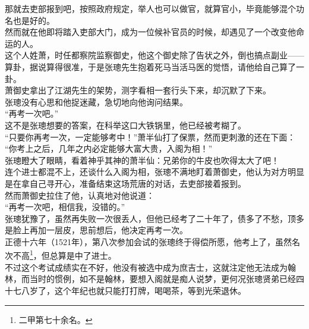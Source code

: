 \begin{multicols}{\theparacolNo}
那就去吏部报到吧，按照政府规定，举人也可以做官，就算官小，毕竟能够混个功名也是好的。\\

然而就在他即将踏入吏部大门，成为一位候补官员的时候，却遇见了一个改变他命运的人。\\

这个人姓萧，时任都察院监察御史，他这个御史除了告状之外，倒也搞点副业——算卦，据说算得很准，于是张璁先生抱着死马当活马医的觉悟，请他给自己算了一卦。\\

萧御史拿出了江湖先生的架势，测字看相一套行头下来，却沉默了下来。\\

张璁没有心思和他捉迷藏，急切地向他询问结果。\\

“再考一次吧。”\\

这不是张璁想要的答案，在科举这口大铁锅里，他已经被考糊了。\\

“只要你再考一次，一定能够考中！”萧半仙打了保票，然而更刺激的还在下面：\\

“你考上之后，几年之内必定能够大富大贵，入阁为相！”\\

张璁瞪大了眼睛，看着神乎其神的萧半仙：兄弟你的牛皮也吹得太大了吧！\\

连个进士都混不上，还谈什么入阁为相，张璁不满地盯着萧御史，他认为对方明显是在拿自己寻开心，准备结束这场荒唐的对话，去吏部接着报到。\\

然而萧御史拉住了他，认真地对他说道：\\

“再考一次吧，相信我，没错的。”\\

张璁犹豫了，虽然再失败一次很丢人，但他已经考了二十年了，债多了不愁，顶多是脸上再加一层皮，思前想后，他决定再考一次。\\

正德十六年（1521年），第八次参加会试的张璁终于得偿所愿，他考上了，虽然名次不高\footnote{二甲第七十余名。}，但总算是中了进士。\\

不过这个考试成绩实在不好，他没有被选中成为庶吉士，这就注定他无法成为翰林，而当时的惯例，如不是翰林，要想入阁就是痴人说梦，更何况张璁贤弟已经四十七八岁了，这个年纪也就只能打打牌，喝喝茶，等到光荣退休。\\


\end{multicols}
